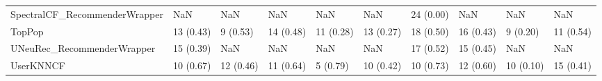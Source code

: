 \begin{tabular}{llllllllll}
      SpectralCF\_RecommenderWrapper &                      NaN &         NaN &           NaN &          NaN &                  NaN &           24 (0.00) &               NaN &                NaN &               NaN \\
                             TopPop &                13 (0.43) &    9 (0.53) &     14 (0.48) &    11 (0.28) &            13 (0.27) &           18 (0.50) &         16 (0.43) &           9 (0.20) &         11 (0.54) \\
         UNeuRec\_RecommenderWrapper &                15 (0.39) &         NaN &           NaN &          NaN &                  NaN &           17 (0.52) &         15 (0.45) &                NaN &               NaN \\
                          UserKNNCF &                10 (0.67) &   12 (0.46) &     11 (0.64) &     5 (0.79) &            10 (0.42) &           10 (0.73) &         12 (0.60) &          10 (0.10) &         15 (0.41) \\
\bottomrule
\end{tabular}
